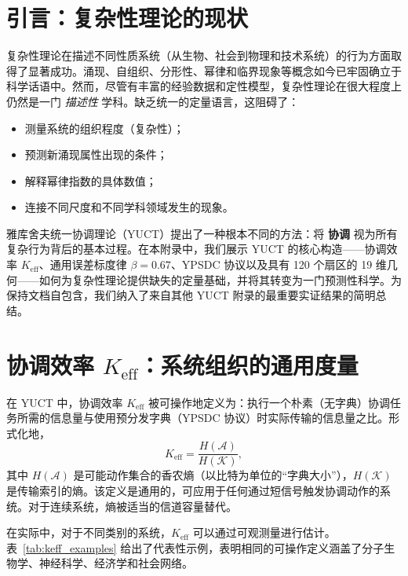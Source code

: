 \documentclass[11pt]{article}
\theoremstyle{remark}
\newcommand{\Keff}{K_{\mathrm{eff}}}
\begin{document}
	\tableofcontents
	\newpage
	
	\section{引言：复杂性理论的现状}
	\label{sec:intro}
	
	复杂性理论在描述不同性质系统（从生物、社会到物理和技术系统）的行为方面取得了显著成功。涌现、自组织、分形性、幂律和临界现象等概念如今已牢固确立于科学话语中。然而，尽管有丰富的经验数据和定性模型，复杂性理论在很大程度上仍然是一门 \emph{描述性} 学科。缺乏统一的定量语言，这阻碍了：
	\begin{itemize}
		\item 测量系统的组织程度（复杂性）；
		\item 预测新涌现属性出现的条件；
		\item 解释幂律指数的具体数值；
		\item 连接不同尺度和不同学科领域发生的现象。
	\end{itemize}
	
	雅库舍夫统一协调理论（YUCT）提出了一种根本不同的方法：将 \textbf{协调} 视为所有复杂行为背后的基本过程。在本附录中，我们展示 YUCT 的核心构造——协调效率 \(\Keff\)、通用误差标度律 \(\beta = 0.67\)、YPSDC 协议以及具有 120 个扇区的 19 维几何——如何为复杂性理论提供缺失的定量基础，并将其转变为一门预测性科学。为保持文档自包含，我们纳入了来自其他 YUCT 附录的最重要实证结果的简明总结。
	
	\section{协调效率 \texorpdfstring{\(\Keff\)}{Keff}：系统组织的通用度量}
	\label{sec:keff}
	
	在 YUCT 中，协调效率 \(\Keff\) 被可操作地定义为：执行一个朴素（无字典）协调任务所需的信息量与使用预分发字典（YPSDC 协议）时实际传输的信息量之比。形式化地，
	\begin{equation}
		\Keff = \frac{H(\mathcal{A})}{H(\mathcal{K})},
	\end{equation}
	其中 \(H(\mathcal{A})\) 是可能动作集合的香农熵（以比特为单位的“字典大小”），\(H(\mathcal{K})\) 是传输索引的熵。该定义是通用的，可应用于任何通过短信号触发协调动作的系统。对于连续系统，熵被适当的信道容量替代。
	
	在实际中，对于不同类别的系统，\(\Keff\) 可以通过可观测量进行估计。表~\ref{tab:keff_examples} 给出了代表性示例，表明相同的可操作定义涵盖了分子生物学、神经科学、经济学和社会网络。
	
\end{document}
